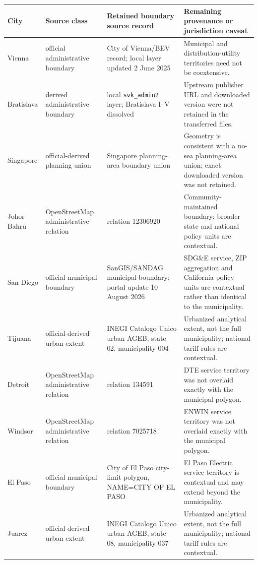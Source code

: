 \begin{tabular}{@{}>{\raggedright\arraybackslash}p{1.2cm}>{\raggedright\arraybackslash}p{3.0cm}>{\raggedright\arraybackslash}p{4.1cm}>{\raggedright\arraybackslash}p{6.0cm}@{}}
\toprule
City & Source class & Retained boundary source record & Remaining provenance or jurisdiction caveat \\
\midrule
Vienna & official administrative boundary & City of Vienna/BEV record; local layer updated 2 June 2025 & Municipal and distribution-utility territories need not be coextensive. \\
Bratislava & derived administrative boundary & local \texttt{svk\_admin2} layer; Bratislava I--V dissolved & Upstream publisher URL and downloaded version were not retained in the transferred files. \\
Singapore & official-derived planning union & Singapore planning-area boundary union & Geometry is consistent with a no-sea planning-area union; exact downloaded version was not retained. \\
Johor Bahru & OpenStreetMap administrative relation & relation 12306920 & Community-maintained boundary; broader state and national policy units are contextual. \\
San Diego & official municipal boundary & SanGIS/SANDAG municipal boundary; portal update 10 August 2026 & SDG\&E service, ZIP aggregation and California policy units are contextual rather than identical to the municipality. \\
Tijuana & official-derived urban extent & INEGI Catalogo Unico urban AGEB, state 02, municipality 004 & Urbanized analytical extent, not the full municipality; national tariff rules are contextual. \\
Detroit & OpenStreetMap administrative relation & relation 134591 & DTE service territory was not overlaid exactly with the municipal polygon. \\
Windsor & OpenStreetMap administrative relation & relation 7025718 & ENWIN service territory was not overlaid exactly with the municipal polygon. \\
El Paso & official municipal boundary & City of El Paso city-limit polygon, NAME=CITY OF EL PASO & El Paso Electric service territory is contextual and may extend beyond the municipality. \\
Juarez & official-derived urban extent & INEGI Catalogo Unico urban AGEB, state 08, municipality 037 & Urbanized analytical extent, not the full municipality; national tariff rules are contextual. \\

\end{tabular}
